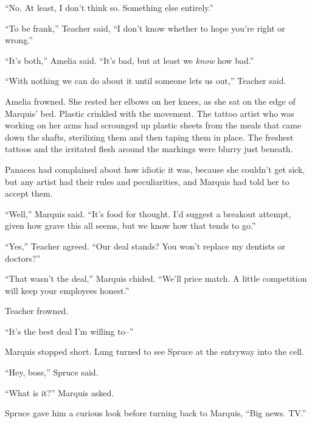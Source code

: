 ``No.  At least, I don't think so.  Something else entirely.''



``To be frank,'' Teacher said, ``I don't know whether to hope you're right or wrong.''



``It's both,'' Amelia said.  ``It's bad, but at least we \emph{know} how bad.''



``With nothing we can do about it until someone lets us out,'' Teacher said.



Amelia frowned.  She rested her elbows on her knees, as she sat on the edge of Marquis' bed.  Plastic crinkled with the movement.  The tattoo artist who was working on her arms had scrounged up plastic sheets from the meals that came down the shafts, sterilizing them and then taping them in place.  The freshest tattoos and the irritated flesh around the markings were blurry just beneath.



Panacea had complained about how idiotic it was, because she couldn't get sick, but any artist had their rules and peculiarities, and Marquis had told her to accept them.



``Well,'' Marquis said.  ``It's food for thought.  I'd suggest a breakout attempt, given how grave this all seems, but we know how that tends to go.''



``Yes,'' Teacher agreed.  ``Our deal stands?  You won't replace my dentists or doctors?''



``That wasn't the deal,'' Marquis chided.  ``We'll price match.  A little competition will keep your employees honest.''



Teacher frowned.



``It's the best deal I'm willing to--''



Marquis stopped short.  Lung turned to see Spruce at the entryway into the cell.



``Hey, boss,'' Spruce said.



``What is it?'' Marquis asked.



Spruce gave him a curious look before turning back to Marquis, ``Big news. TV.''



